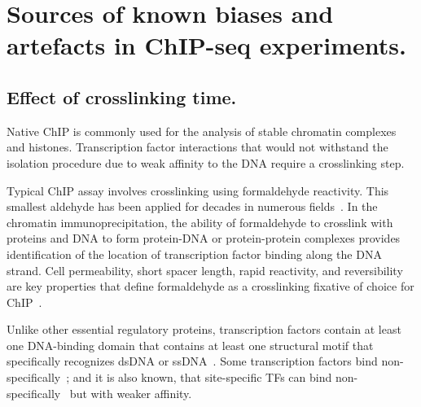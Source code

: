 \chapter{Sources of known biases and artefacts in ChIP-seq experiments.}



\section{Effect of crosslinking time.}
\label{formaldehyde}


Native ChIP is commonly used for the analysis of stable chromatin complexes~\cite{kasinathan2014high} and histones.
Transcription factor interactions that would not withstand the isolation procedure due to weak affinity to the DNA require a crosslinking step.

Typical ChIP assay involves crosslinking using formaldehyde reactivity. 
This smallest aldehyde has been applied for decades in numerous fields~\cite{eckels2003formalin,werner2000effect,gavrilov2015vivo}.
In the chromatin immunoprecipitation, the ability of formaldehyde to crosslink with proteins and DNA to form protein-DNA or protein-protein complexes provides identification of the location of transcription factor binding along the DNA strand.
Cell permeability, short spacer length, rapid reactivity, and reversibility are key properties that define formaldehyde as a crosslinking fixative of choice for ChIP~\cite{hoffman2015formaldehyde}.

Unlike other essential regulatory proteins, transcription factors contain at least one DNA-binding domain that contains at least one structural motif that specifically recognizes dsDNA or ssDNA~\cite{mitchell1989transcriptional}.
Some transcription factors bind non-specifically~\cite{struhl2007interpreting};
and it is also known, that site-specific TFs can bind non-specifically~\cite{hammar2012lac,mirny2009protein} but with weaker affinity.


